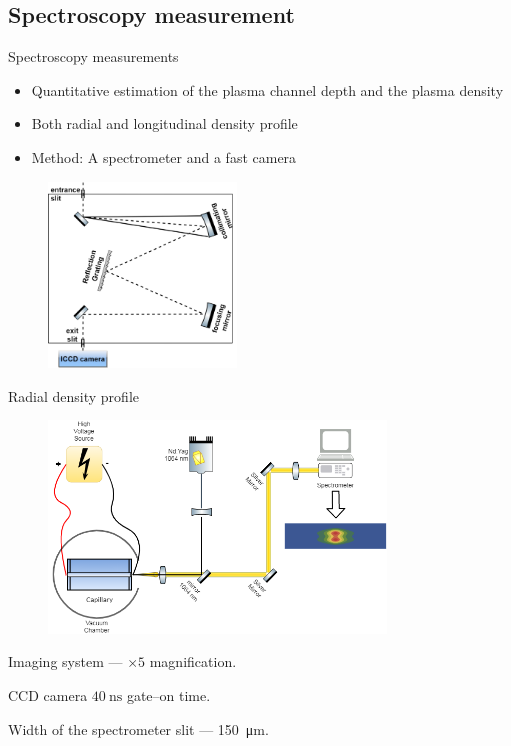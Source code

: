 \documentclass[dvipsnames]{beamer}
\begin{document}
\subsection{Spectroscopy measurement}
\begin{frame}{Spectroscopy measurements}
 \begin{itemize}
  \item Quantitative estimation of the plasma channel depth and the plasma density
  \item Both radial and longitudinal density profile
  \item Method: A spectrometer and a fast camera
 \end{itemize}
 \begin{figure}
  \includegraphics[height=140pt]{figures/results/spectro/spectrometer.png}
 \end{figure}
\end{frame}
\begin{frame}{Radial density profile}
 \begin{figure}
   \includegraphics[width=0.8\textwidth]{figures/results/spectro/radial_system.png}
 \end{figure}
Imaging system --- $\times 5$ magnification.

CCD camera $\SI{40}{\ns}$ gate--on time. 

Width of the spectrometer slit --- \SI{150}{\um}.
\end{frame}
\end{document}
